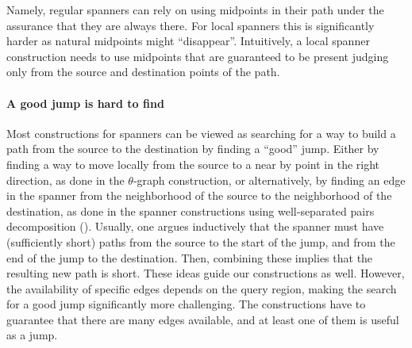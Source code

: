 Namely, regular spanners can rely on using midpoints in their path
under the assurance that they are always there. For local spanners
this is significantly harder as natural midpoints might
``disappear''. Intuitively, a local spanner construction needs to use
midpoints that are guaranteed to be present judging only from the
source and destination points of the path.

\paragraph*{A good jump is hard to find}

Most constructions for spanners can be viewed as searching for a way
to build a path from the source to the destination by finding a
``good'' jump. Either by finding a way to move locally from the source
to a near by point in the right direction, as done in the
$\theta$-graph construction, or alternatively, by finding an edge in
the spanner from the neighborhood of the source to the neighborhood of
the destination, as done in the spanner constructions using
well-separated pairs decomposition (\WSPD). Usually, one argues
inductively that the spanner must have (sufficiently short) paths from
the source to the start of the jump, and from the end of the jump to
the destination. Then, combining these implies that the resulting new
path is short.  These ideas guide our constructions as well. However,
the availability of specific edges depends on the query region, making
the search for a good jump significantly more challenging. The
constructions have to guarantee that there are many edges available,
and at least one of them is useful as a jump.


